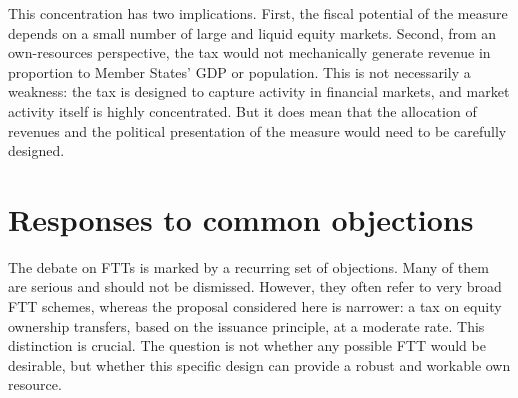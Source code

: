 \documentclass[../main]{subfiles}
\begin{document}
This concentration has two implications. First, the fiscal potential of the measure depends on a small number of large and liquid equity markets. Second, from an own-resources perspective, the tax would not mechanically generate revenue in proportion to Member States' GDP or population. This is not necessarily a weakness: the tax is designed to capture activity in financial markets, and market activity itself is highly concentrated. But it does mean that the allocation of revenues and the political presentation of the measure would need to be carefully designed.


\section{Responses to common objections}

The debate on FTTs is marked by a recurring set of objections. Many of them are serious and should not be dismissed. However, they often refer to very broad FTT schemes, whereas the proposal considered here is narrower: a tax on equity ownership transfers, based on the issuance principle, at a moderate rate. This distinction is crucial. The question is not whether any possible FTT would be desirable, but whether this specific design can provide a robust and workable own resource.
\end{document}
